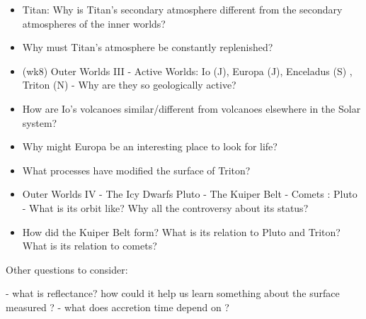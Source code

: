 \documentclass[paper=a4, fontsize=11pt]{scrartcl} %
\numberwithin{equation}{section} %
\begin{document}
\begin{itemize}
\item Titan: Why is Titan's secondary atmosphere different from the secondary atmospheres of the inner worlds?
\item Why must Titan's atmosphere be constantly replenished? 

\item (wk8)   Outer Worlds III - Active Worlds:  Io (J),  Europa (J),  Enceladus (S) , Triton (N) - Why are they so geologically active?
\item   How are Io's volcanoes similar/different from volcanoes elsewhere in the Solar system?
\item Why might Europa be an interesting place to look for life?
\item What processes have modified the surface of Triton?

\item Outer Worlds IV - The Icy Dwarfs Pluto - The Kuiper Belt - Comets : Pluto -  What is its orbit like?
Why all the controversy about its status?
\item  How did the Kuiper Belt form? What is its relation to Pluto and Triton? What is its relation to comets?

\end{itemize}

Other questions to consider:

- what is reflectance? how could it help us learn something about the surface measured ? 
- what does accretion time depend on ? 

\end{document}
